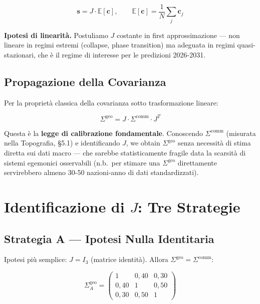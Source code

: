 \[
\mathbf{s} = J \cdot \mathbb{E}[\mathbf{c}], \qquad \mathbb{E}[\mathbf{c}] = \frac{1}{N}\sum_j \mathbf{c}_j
\]

\Hypoth{} \textbf{Ipotesi di linearità.} Postuliamo \(J\) costante in
first approssimazione --- non lineare in regimi estremi (collapse,
phase transition) ma adeguata in regimi quasi-stazionari, che è il
regime di interesse per le predizioni 2026-2031.

\subsection{Propagazione della
Covarianza}\label{propagazione-della-covarianza}

Per la proprietà classica della covarianza sotto trasformazione lineare:

\[
\boxed{\Sigma^{\text{geo}} = J \cdot \Sigma^{\text{comm}} \cdot J^T}
\]

Questa è la \textbf{legge di calibrazione fondamentale}. Conoscendo
\(\Sigma^{\text{comm}}\) (misurata nella Topografia, \S{}5.1) e
identificando \(J\), we obtain \(\Sigma^{\text{geo}}\) senza necessità
di stima diretta sui dati macro --- che sarebbe statisticamente fragile
data la scarsità di sistemi egemonici osservabili (n.b.~per stimare una
\(\Sigma^{\text{geo}}\) direttamente servirebbero almeno 30-50
nazioni-anno di dati standardizzati).



\section{\texorpdfstring{Identificazione di \(J\): Tre
Strategie}{Identificazione di J: Tre Strategie}}\label{identificazione-di-j-tre-strategie}

\subsection{Strategia A --- Ipotesi Nulla
Identitaria}\label{strategia-a-hypothesis-nulla-identitaria}

Ipotesi più semplice: \(J = I_3\) (matrice identità). Allora
\(\Sigma^{\text{geo}} = \Sigma^{\text{comm}}\):

\[
\Sigma^{\text{geo}}_A = \begin{pmatrix} 1 & 0{,}40 & 0{,}30 \\ 0{,}40 & 1 & 0{,}50 \\ 0{,}30 & 0{,}50 & 1 \end{pmatrix}
\]


